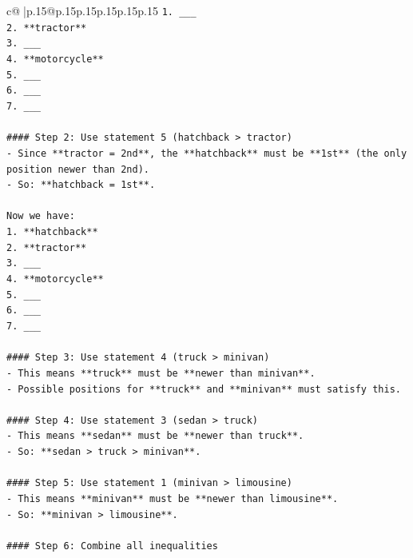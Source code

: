 \documentclass{article}
\begin{document}
{\begin{supertabular}{c@{$\;$}|p{.15\linewidth}@{}p{.15\linewidth}p{.15\linewidth}p{.15\linewidth}p{.15\linewidth}p{.15\linewidth}}
{{{\texttt{1. \_\_\_} \\
\texttt{2. **tractor**} \\
\texttt{3. \_\_\_} \\
\texttt{4. **motorcycle**} \\
\texttt{5. \_\_\_} \\
\texttt{6. \_\_\_} \\
\texttt{7. \_\_\_} \\
\\ 
\texttt{\#\#\#\# Step 2: Use statement 5 (hatchback > tractor)} \\
\texttt{{-} Since **tractor = 2nd**, the **hatchback** must be **1st** (the only position newer than 2nd).} \\
\texttt{{-} So: **hatchback = 1st**.} \\
\\ 
\texttt{Now we have:} \\
\texttt{1. **hatchback**} \\
\texttt{2. **tractor**} \\
\texttt{3. \_\_\_} \\
\texttt{4. **motorcycle**} \\
\texttt{5. \_\_\_} \\
\texttt{6. \_\_\_} \\
\texttt{7. \_\_\_} \\
\\ 
\texttt{\#\#\#\# Step 3: Use statement 4 (truck > minivan)} \\
\texttt{{-} This means **truck** must be **newer than minivan**.} \\
\texttt{{-} Possible positions for **truck** and **minivan** must satisfy this.} \\
\\ 
\texttt{\#\#\#\# Step 4: Use statement 3 (sedan > truck)} \\
\texttt{{-} This means **sedan** must be **newer than truck**.} \\
\texttt{{-} So: **sedan > truck > minivan**.} \\
\\ 
\texttt{\#\#\#\# Step 5: Use statement 1 (minivan > limousine)} \\
\texttt{{-} This means **minivan** must be **newer than limousine**.} \\
\texttt{{-} So: **minivan > limousine**.} \\
\\ 
\texttt{\#\#\#\# Step 6: Combine all inequalities} \\
}}}
\end{supertabular}}
\end{document}
